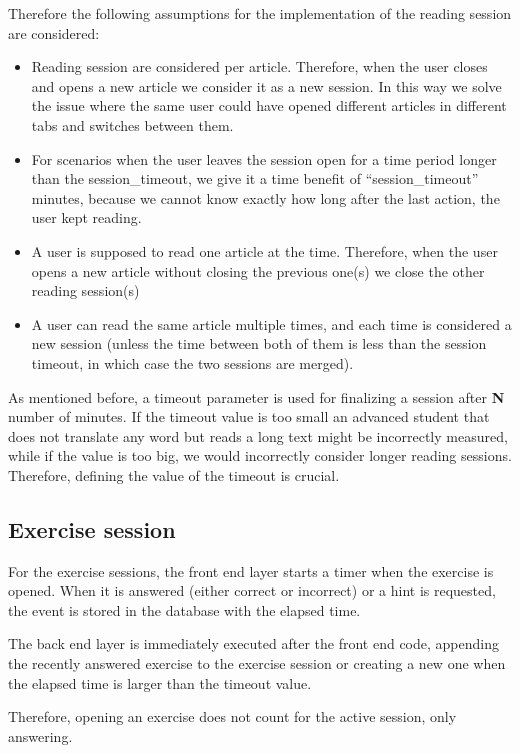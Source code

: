 Therefore the following assumptions for the implementation of the reading session are considered:
\begin{itemize}
\item Reading session are considered per article. Therefore, when the user closes and opens a new article we consider it as a new session. In this way we solve the issue where the same user could have opened different articles in different tabs and switches between them.

\item For scenarios when the user leaves the session open for a time period longer than the session\_timeout, we give it a time benefit of “session\_timeout” minutes, because we cannot know exactly how long after the last action, the user kept reading. 

\item A user is supposed to read one article at the time. Therefore, when the user opens a new article without closing the previous one(s) we close the other reading session(s)

\item A user can read the same article multiple times, and each time is considered a new session (unless the time between both of them is less than the session timeout, in which case the two sessions are merged).
\end{itemize}

As mentioned before, a timeout parameter is used for finalizing a session after \textbf{N} number of minutes. If the timeout value is too small an advanced student that does not translate any word but reads a long text might be incorrectly measured, while if the value is too big, we would incorrectly consider longer reading sessions. Therefore, defining the value of the timeout is crucial. 


\subsection{Exercise session}
For the exercise sessions, the front end layer starts a timer when the exercise is opened. When it is answered (either correct or incorrect) or a hint is requested, the event is stored in the database with the elapsed time.

The back end layer is immediately executed after the front end code, appending the recently answered exercise to the exercise session or creating a new one when the elapsed time is larger than the timeout value.

Therefore, opening an exercise does not count for the active session, only answering.

